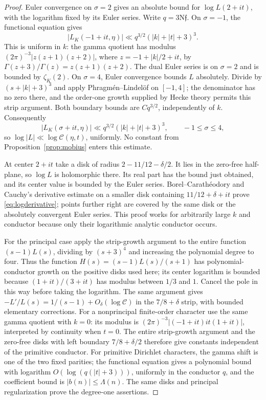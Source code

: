\documentclass[11pt,a4paper]{article}
\numberwithin{equation}{section}
\theoremstyle{definition}
\theoremstyle{remark}
\newcommand{\N}{\mathrm N}
\begin{document}
\begin{proof}
Euler convergence on $\sigma=2$ gives an absolute bound for $\log L(2+it)$, with the logarithm fixed by its Euler series. Write $q=3\N\mathfrak f$. On $\sigma=-1$, the functional equation gives
\[
 |L_K(-1+it,\eta)|\ll q^{3/2}(|k|+|t|+3)^3.
\]
This is uniform in $k$: the gamma quotient has modulus $(2\pi)^{-3}|z(z+1)(z+2)|$, where $z=-1+|k|/2+it$, by $\Gamma(z+3)/\Gamma(z)=z(z+1)(z+2)$. The dual Euler series is on $\sigma=2$ and is bounded by $\zeta_K(2)$. On $\sigma=4$, Euler convergence bounds $L$ absolutely. Divide by $(s+|k|+3)^3$ and apply Phragm\'en--Lindel\"of on $[-1,4]$; the denominator has no zero there, and the order-one growth supplied by Hecke theory permits this strip argument. Both boundary bounds are $Cq^{3/2}$, independently of $k$. Consequently
\[
 |L_K(\sigma+it,\eta)|\ll q^{3/2}(|k|+|t|+3)^3,
 \qquad -1\le\sigma\le4,
\]
so $\log|L|\ll\log\mathcal C(\eta,t)$, uniformly. No constant from Proposition~\ref{prop:mobius} enters this estimate.

At center $2+it$ take a disk of radius $2-11/12-\delta/2$. It lies in the zero-free half-plane, so $\log L$ is holomorphic there. Its real part has the bound just obtained, and its center value is bounded by the Euler series. Borel--Carath\'eodory and Cauchy's derivative estimate on a smaller disk containing $11/12+\delta+it$ prove \eqref{eq:logderivative}; points further right are covered by the same disk or the absolutely convergent Euler series. This proof works for arbitrarily large $k$ and conductor because only their logarithmic analytic conductor occurs.

For the principal case apply the strip-growth argument to the entire function $(s-1)L(s)$, dividing by $(s+3)^4$ and increasing the polynomial degree to four. Thus the function $H(s)=(s-1)L(s)/(s+1)$ has polynomial-conductor growth on the positive disks used here; its center logarithm is bounded because $(1+it)/(3+it)$ has modulus between $1/3$ and $1$. Cancel the pole in this way before taking the logarithm. The same argument gives $-L'/L(s)=1/(s-1)+O_\delta(\log\mathcal C)$ in the $7/8+\delta$ strip, with bounded elementary corrections. For a nonprincipal finite-order character use the same gamma quotient with $k=0$: its modulus is $(2\pi)^{-3}|(-1+it)it(1+it)|$, interpreted by continuity when $t=0$. The entire strip-growth argument and the zero-free disks with left boundary $7/8+\delta/2$ therefore give constants independent of the primitive conductor. For primitive Dirichlet characters, the gamma shift is one of the two fixed parities; the functional equation gives a polynomial bound with logarithm $O(\log(q(|t|+3)))$, uniformly in the conductor $q$, and the coefficient bound is $|b(n)|\le\Lambda(n)$. The same disks and principal regularization prove the degree-one assertions.


\end{proof}
\end{document}
